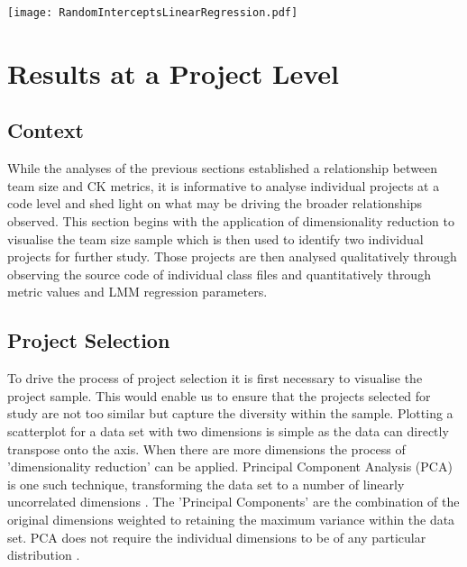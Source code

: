 \begin{table}
\centering 
{}
\begin{tabular}
 \centering 
 \texttt{[image: RandomInterceptsLinearRegression.pdf]}
 \label{tab:TeamSizeRandomInterceptsLinearRegression}
\end{tabular}
\end{table}

\section{Results at a Project Level} %
\subsection{Context}
While the analyses of the previous sections established a relationship between team size and CK metrics, it is informative to analyse individual projects at a code level and shed light on what may be driving the broader relationships observed. This section begins with the application of dimensionality reduction to visualise the team size sample which is then used to identify two individual projects for further study. Those projects are then analysed qualitatively through observing the source code of individual class files and quantitatively through metric values and LMM regression parameters.

\subsection{Project Selection}
To drive the process of project selection it is first necessary to visualise the project sample. This would enable us to ensure that the projects selected for study are not too similar but capture the diversity within the sample. Plotting a scatterplot for a data set with two dimensions is simple as the data can directly transpose onto the axis. When there are more dimensions the process of 'dimensionality reduction' can be applied. Principal Component Analysis (PCA) is one such technique, transforming the data set to a number of linearly uncorrelated dimensions \citep{pearson1901liii}. The 'Principal Components' are the combination of the original dimensions weighted to retaining the maximum variance within the data set.  PCA does not require the individual dimensions to be of any particular distribution \citep{timm10applied}.

